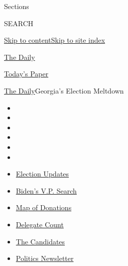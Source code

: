 Sections

SEARCH

\protect\hyperlink{site-content}{Skip to
content}\protect\hyperlink{site-index}{Skip to site index}

\href{https://www.nytimes3xbfgragh.onion/podcasts/the-daily}{The Daily}

\href{https://myaccount.nytimes3xbfgragh.onion/auth/login?response_type=cookie\&client_id=vi}{}

\href{https://www.nytimes3xbfgragh.onion/section/todayspaper}{Today's
Paper}

\href{/podcasts/the-daily}{The Daily}\textbar{}Georgia's Election
Meltdown

\begin{itemize}
\item
\item
\item
\item
\item
\item
\end{itemize}

\begin{itemize}
\item
  \href{https://www.nytimes3xbfgragh.onion/2020/08/04/us/elections/primary-election-michigan-arizona-kansas.html?action=click\&pgtype=Article\&state=default\&region=TOP_BANNER\&context=storylines_menu}{Election
  Updates}
\item
  \href{https://www.nytimes3xbfgragh.onion/article/biden-vice-president-2020.html?action=click\&pgtype=Article\&state=default\&region=TOP_BANNER\&context=storylines_menu}{Biden's
  V.P. Search}
\item
  \href{https://www.nytimes3xbfgragh.onion/interactive/2020/07/24/us/politics/trump-biden-campaign-donors.html?action=click\&pgtype=Article\&state=default\&region=TOP_BANNER\&context=storylines_menu}{Map
  of Donations}
\item
  \href{https://www.nytimes3xbfgragh.onion/interactive/2020/us/elections/delegate-count-primary-results.html?action=click\&pgtype=Article\&state=default\&region=TOP_BANNER\&context=storylines_menu}{Delegate
  Count}
\item
  \href{https://www.nytimes3xbfgragh.onion/interactive/2019/us/politics/2020-presidential-candidates.html?action=click\&pgtype=Article\&state=default\&region=TOP_BANNER\&context=storylines_menu}{The
  Candidates}
\item
  \href{https://www.nytimes3xbfgragh.onion/newsletters/politics?action=click\&pgtype=Article\&state=default\&region=TOP_BANNER\&context=storylines_menu}{Politics
  Newsletter}
\end{itemize}

